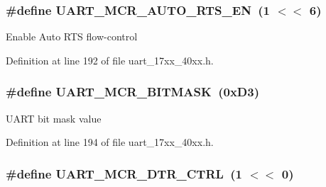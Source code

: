 \subsubsection[{\texorpdfstring{U\+A\+R\+T\+\_\+\+M\+C\+R\+\_\+\+A\+U\+T\+O\+\_\+\+R\+T\+S\+\_\+\+EN}{UART_MCR_AUTO_RTS_EN}}]{\setlength{\rightskip}{0pt plus 5cm}\#define U\+A\+R\+T\+\_\+\+M\+C\+R\+\_\+\+A\+U\+T\+O\+\_\+\+R\+T\+S\+\_\+\+EN~(1 $<$$<$ 6)}\hypertarget{group__UART__17XX__40XX_gae26cd92b527d6d6ec9f7fd98aeefd94a}{}\label{group__UART__17XX__40XX_gae26cd92b527d6d6ec9f7fd98aeefd94a}
Enable Auto R\+TS flow-\/control 

Definition at line 192 of file uart\+\_\+17xx\+\_\+40xx.\+h.

\subsubsection[{\texorpdfstring{U\+A\+R\+T\+\_\+\+M\+C\+R\+\_\+\+B\+I\+T\+M\+A\+SK}{UART_MCR_BITMASK}}]{\setlength{\rightskip}{0pt plus 5cm}\#define U\+A\+R\+T\+\_\+\+M\+C\+R\+\_\+\+B\+I\+T\+M\+A\+SK~(0x\+D3)}\hypertarget{group__UART__17XX__40XX_ga0cc006116ea98bd8b00e948073b8d749}{}\label{group__UART__17XX__40XX_ga0cc006116ea98bd8b00e948073b8d749}
U\+A\+RT bit mask value 

Definition at line 194 of file uart\+\_\+17xx\+\_\+40xx.\+h.

\subsubsection[{\texorpdfstring{U\+A\+R\+T\+\_\+\+M\+C\+R\+\_\+\+D\+T\+R\+\_\+\+C\+T\+RL}{UART_MCR_DTR_CTRL}}]{\setlength{\rightskip}{0pt plus 5cm}\#define U\+A\+R\+T\+\_\+\+M\+C\+R\+\_\+\+D\+T\+R\+\_\+\+C\+T\+RL~(1 $<$$<$ 0)}\hypertarget{group__UART__17XX__40XX_ga9fdc7f45b2fb3679b64164b34afb9350}{}\label{group__UART__17XX__40XX_ga9fdc7f45b2fb3679b64164b34afb9350}


